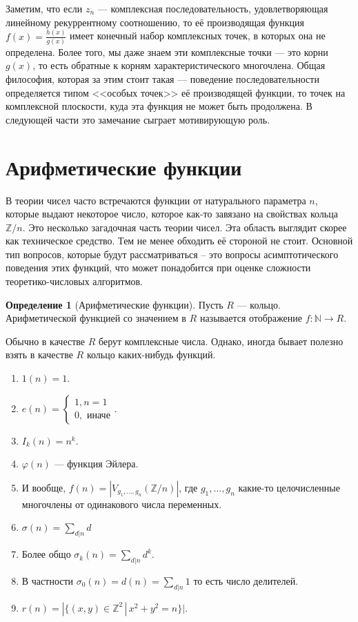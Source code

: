 \documentclass[10pt,a4paper,oneside]{book}
\theoremstyle{definition}
\newtheorem{defn}{Определение}
\newcommand{\mb}[1]{\mathbb{#1}}
\def\exm{\noindent {\bf Примеры:}}
\def\dfn{\begin{defn}}
\def\edfn{\end{defn}}
\begin{document}
 


Заметим, что если $z_n$ --- комплексная последовательность, удовлетворяющая линейному рекуррентному соотношению, то её производящая функция $f(x)=\frac{h(x)}{g(x)}$ имеет конечный набор комплексных точек, в которых она не определена. Более того, мы даже знаем эти комплексные точки --- это корни $g(x)$, то есть обратные к корням характеристического многочлена. Общая философия, которая за этим стоит такая --- поведение последовательности определяется типом <<особых точек>> её производящей функции, то точек на комплексной плоскости, куда эта  функция не может быть продолжена. В следующей части это замечание сыграет мотивирующую роль.




\section{Арифметические функции}
В теории чисел часто встречаются функции от натурального параметра $n$, которые выдают некоторое число, которое как-то завязано на свойствах кольца $\mb Z/n$. Это несколько загадочная часть теории чисел. Эта область выглядит скорее как техническое средство. Тем не менее обходить её стороной не стоит. Основной тип вопросов, которые будут рассматриваться -- это вопросы асимптотического поведения этих функций, что может понадобится при оценке сложности теоретико-числовых алгоритмов.

\dfn[Арифметические функции] Пусть $R$ --- кольцо. Арифметической функцией со значением в $R$ называется отображение $f\colon \mb N \to R$.
\edfn

Обычно в качестве $R$ берут комплексные числа. Однако, иногда бывает полезно взять в качестве $R$ кольцо каких-нибудь функций.

\exm
\begin{enumerate}
\item $1(n)=1$.
\item $e(n)=\begin{cases} 1, n=1 \\ 0, \text{ иначе}\end{cases}.$
\item $I_k(n)=n^k$.
\item $\varphi(n)$ --- функция Эйлера.
\item И вообще, $f(n)=|V_{g_1,\dots,g_n}(\mb Z/n)|$, где $g_1,\dots,g_n$ какие-то целочисленные многочлены от одинакового числа переменных.
\item $\sigma(n)=\sum_{d|n}d$
\item Более общо $\sigma_k(n)=\sum_{d|n}d^k$.
\item В частности $\sigma_0(n)=d(n)=\sum_{d|n} 1$ то есть число делителей.
\item $r(n)=|\{(x,y)\in \mb Z^2\,|\, x^2+y^2=n\}|$.
\end{enumerate}
\end{document}
